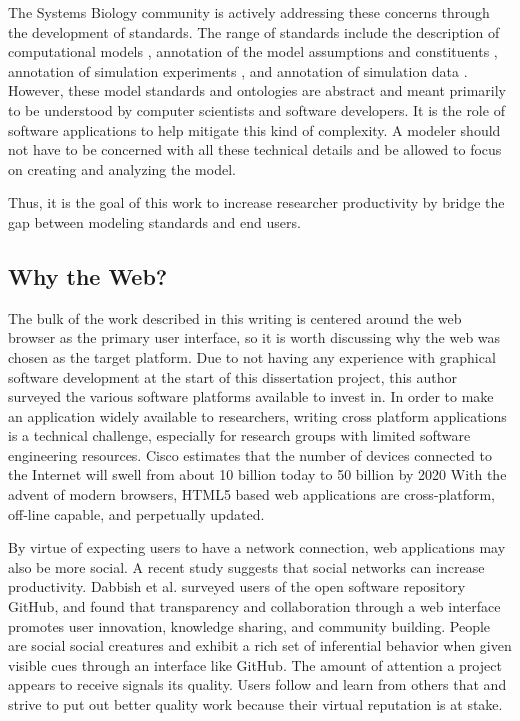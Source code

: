 The Systems Biology community is actively addressing these concerns through the development of standards.
The range of standards include the description of computational models \autocite{hucka:2002d, LloydCellML2004}, annotation of the model assumptions and constituents \autocite{novere2005minimum}, annotation of simulation experiments \autocite{kohn2008sed}, and annotation of simulation data \autocite{dada2010sbrml}.
However, these model standards and ontologies are abstract and meant primarily to be understood by computer scientists and software developers.
It is the role of software applications to help mitigate this kind of complexity.
A modeler should not have to be concerned with all these technical details and be allowed to focus on creating and analyzing the model.

Thus, it is the goal of this work to increase researcher productivity by bridge the gap between modeling standards and end users.

\subsection{Why the Web?}

The bulk of the work described in this writing is centered around the web browser as the primary user interface, so it is worth discussing why the web was chosen as the target platform.
Due to not having any experience with graphical software development at the start of this dissertation project, this author surveyed the various software platforms available to invest in.
In order to make an application widely available to researchers, writing cross platform applications is a technical challenge, especially for research groups with limited software engineering resources. \autocite{cusumano1999netscape}
Cisco estimates that the number of devices connected to the Internet will swell from about 10 billion today to 50 billion by 2020 \autocite{clark2014internet}
With the advent of modern browsers, HTML5 based web applications are cross-platform, off-line capable, and perpetually updated. \autocite{o2007web}

By virtue of expecting users to have a network connection, web applications may also be more social.
A recent study \autocite{dabbish2012social} suggests that social networks can increase productivity.
Dabbish et al. surveyed users of the open software repository GitHub, and found that transparency and collaboration through a web interface promotes user innovation, knowledge sharing, and community building.
People are social social creatures and exhibit a rich set of inferential behavior when given visible cues through an interface like GitHub.
The amount of attention a project appears to receive signals its quality.
Users follow and learn from others that and strive to put out better quality work because their virtual reputation is at stake.

